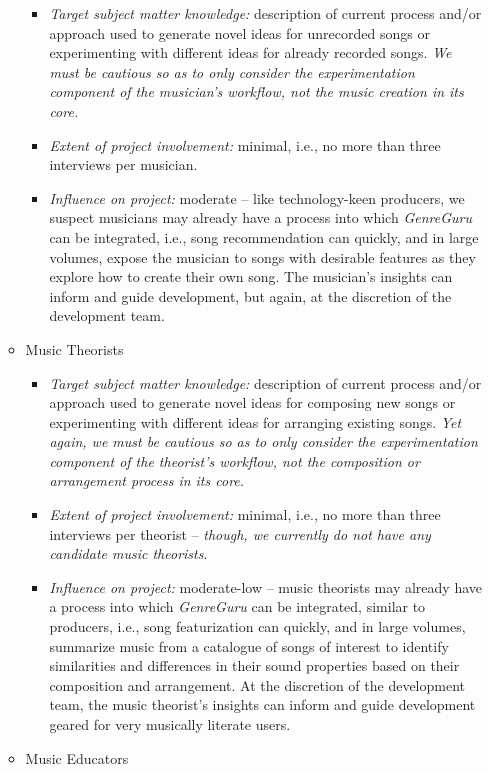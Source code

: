 \documentclass[12pt]{article}
\begin{document}
\begin{itemize}
\begin{itemize}
    \begin{itemize}
      \item \emph{Target subject matter knowledge:} description of current process and/or approach used to generate novel ideas for unrecorded songs or experimenting with different ideas for already recorded songs. \emph{We must be cautious so as to only consider the experimentation component of the musician's workflow, not the music creation in its core.}
      \item \emph{Extent of project involvement:} minimal, i.e., no more than three interviews per musician.
      \item \emph{Influence on project:} moderate -- like technology-keen producers, we suspect musicians may already have a process into which \emph{GenreGuru} can be integrated, i.e., song recommendation can quickly, and in large volumes, expose the musician to songs with desirable features as they explore how to create their own song. The musician's insights can inform and guide development, but again, at the discretion of the development team.
    \end{itemize}
    \item Music Theorists
    \begin{itemize}
      \item \emph{Target subject matter knowledge:} description of current process and/or approach used to generate novel ideas for composing new songs or experimenting with different ideas for arranging existing songs. \emph{Yet again, we must be cautious so as to only consider the experimentation component of the theorist's workflow, not the composition or arrangement process in its core.}
      \item \emph{Extent of project involvement:} minimal, i.e., no more than three interviews per theorist -- \emph{though, we currently do not have any candidate music theorists}.
      \item \emph{Influence on project:} moderate-low -- music theorists may already have a process into which \emph{GenreGuru} can be integrated, similar to producers, i.e., song featurization can quickly, and in large volumes, summarize music from a catalogue of songs of interest to identify similarities and differences in their sound properties based on their composition and arrangement. At the discretion of the development team, the music theorist's insights can inform and guide development geared for very musically literate users.
    \end{itemize}
    \item Music Educators

\end{itemize}
\end{itemize}
\end{document}
